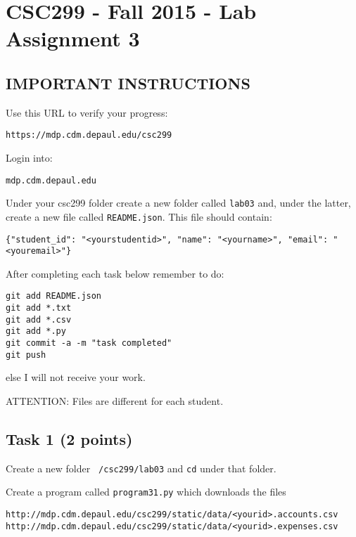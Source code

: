\documentclass[12pt]{article}
\begin{document}
\section{CSC299 - Fall 2015 - Lab Assignment 3}

\subsection*{IMPORTANT INSTRUCTIONS}

\noindent Use this URL to verify your progress:
\begin{verbatim}
https://mdp.cdm.depaul.edu/csc299
\end{verbatim}

\noindent Login into:
\begin{verbatim}
mdp.cdm.depaul.edu
\end{verbatim}

\noindent Under your csc299 folder create a new folder called {\tt lab03} and, under the latter, create a new file called {\tt README.json}. This file should contain:

\begin{verbatim}
{"student_id": "<yourstudentid>", "name": "<yourname>", "email": "<youremail>"}
\end{verbatim}

\noindent After completing each task below remember to do:

\begin{verbatim}
git add README.json
git add *.txt
git add *.csv 
git add *.py
git commit -a -m "task completed"
git push
\end{verbatim}

\noindent  else I will not receive your work.

\noindent ATTENTION: Files are different for each student.

\subsection{Task 1 (2 points)}

\noindent  Create a new folder {\tt ~/csc299/lab03} and {\tt cd} under that folder.

\noindent  Create a program called {\tt program31.py} which downloads the files
\begin{verbatim}
http://mdp.cdm.depaul.edu/csc299/static/data/<yourid>.accounts.csv
http://mdp.cdm.depaul.edu/csc299/static/data/<yourid>.expenses.csv
\end{verbatim}
\end{document}
